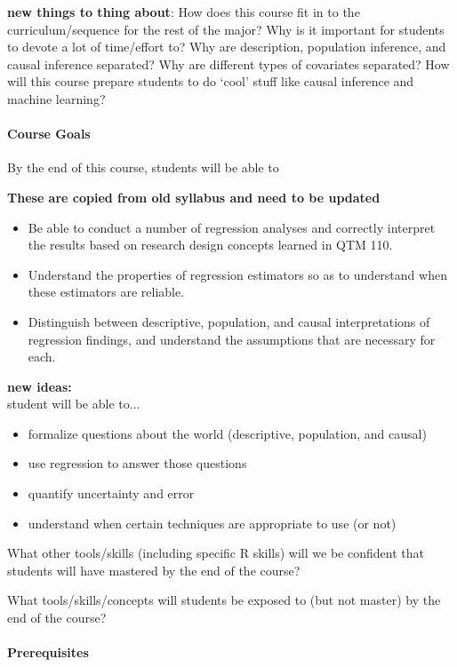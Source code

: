 \documentclass[12pt]{article}
\begin{document}
{\bf new things to thing about}: How does this course fit in to the curriculum/sequence for the rest of the major? Why is it important for students to devote a lot of time/effort to? Why are description, population inference, and causal inference separated? Why are different types of covariates separated? How will this course prepare students to do `cool' stuff like causal inference and machine learning? 
	
\bigskip


\paragraph{Course Goals} By the end of this course, students will be able to 

{\bf These are copied from old syllabus and need to be updated }

\begin{itemize}
\item Be able to conduct a number of regression analyses and correctly interpret the results based on research design concepts learned in QTM 110.
\item Understand the properties of regression estimators so as to understand when these estimators are reliable.
\item Distinguish between descriptive, population, and causal interpretations of regression findings, and understand the assumptions that are necessary for each.
\end{itemize}

{\bf new ideas:} \\
student will be able to...
\begin{itemize}
\item formalize questions about the world (descriptive, population, and causal)
\item use regression to answer those questions 
\item quantify uncertainty and error 
\item understand when certain techniques are appropriate to use (or not) 
\end{itemize}

What other tools/skills (including specific R skills) will we be confident that students will have mastered by the end of the course? 

What tools/skills/concepts will students be exposed to (but not master) by the end of the course? 

\bigskip

\paragraph{Prerequisites}
\end{document}
